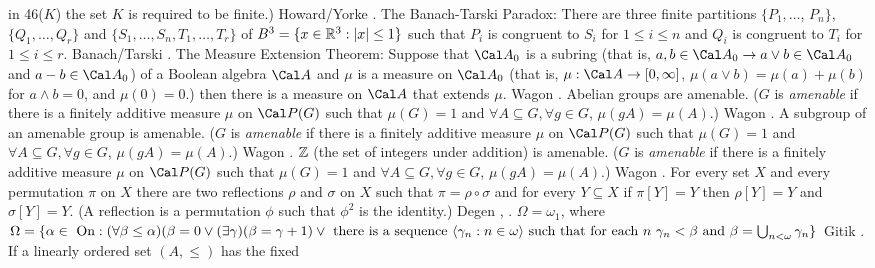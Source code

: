 in 46($K$) the set $K$ is required to be finite.) \ac{Howard/Yorke}
\cite{1987}.
\medskip
{} The Banach-Tarski Paradox: There are three finite
partitions $\{P_1,\ldots$, $P_n\}$, $\{Q_1,\ldots,Q_r\}$ and
$\{S_1,\ldots,S_n, T_1,\ldots,T_r\}$ of $B^3 = \{x\in {\Bbb R}^3 : |x|
\le 1\}$ such that $P_i$ is congruent to $S_i$ for $1\le i\le n$ and
$Q_i$ is congruent to $T_i$ for $1\le i\le r$.  \ac{Banach/Tarski}
\cite{1924}.
\medskip
{} The Measure Extension Theorem: Suppose that $\Cal
A_0$ is a subring (that is, $a,b \in \Cal A_0  \to a\vee b \in \Cal A_0$
and $a-b \in \Cal A_0$) of a Boolean algebra $\Cal A$ and $\mu$ is a
measure on $\Cal A_0$ (that is, $\mu:\Cal A \to [0,\infty]$, $\mu(a\vee b)
=\mu(a)+\mu(b)$ for $a\land b = 0$, and $\mu(0) = 0$.) then there is a
measure on $\Cal A$ that extends $\mu$.  \ac{Wagon} \cite{1985}.
\medskip
{} Abelian groups are amenable. ($G$ is {\it
amenable} if there is a finitely additive measure $\mu$ on $\Cal P(G)$
such that $\mu(G)=1$ and $\forall A\subseteq G, \forall g\in G$,
$\mu(gA)=\mu(A)$.) \ac{Wagon} \cite{1985}.
\medskip
{} A subgroup of an amenable group is amenable.
($G$ is {\it amenable} if there is a finitely additive measure $\mu$ on
$\Cal P(G)$ such that $\mu(G) = 1$ and $\forall A\subseteq G, \forall g
\in G$, $\mu(gA)=\mu(A)$.)  \ac{Wagon} \cite{1985}.
\medskip
{} $\Bbb Z$ (the set of integers under addition) is
amenable.  ($G$ is {\it amenable} if there is a finitely additive
measure $\mu$ on $\Cal P(G)$ such that $\mu(G) = 1$ and $\forall
A\subseteq G, \forall g\in G$, $\mu(gA)=\mu(A)$.)  \ac{Wagon} \cite{1985}.
\medskip
{} For every set $X$ and every permutation $\pi$
on $X$ there are two reflections $\rho$ and $\sigma$ on $X$ such that
$\pi =\rho\circ\sigma$ and for every $Y\subseteq X$ if $\pi[Y]=Y$
then $\rho[Y]=Y$ and $\sigma[Y]=Y$.  (A reflection is a permutation
$\phi$ such that $\phi^2$ is the identity.) \ac{Degen} \cite{1988},
\cite{2000}.
\medskip
{} $\Omega = \omega_1$, where  $\Omega =
\{\alpha\in\hbox{ On}: (\forall\beta\le\alpha)(\beta=0\vee
(\exists\gamma)(\beta=\gamma+1)\vee\hbox{ there is a sequence }
\langle\gamma_n: n\in\omega\rangle\hbox{ such that for each }n\
\gamma_n<\beta\hbox{ and } \beta=\bigcup_{n<\omega}\gamma_n\}$
\ac{Gitik} \cite{1980}.
\medskip
{} If a linearly ordered set $(A,\le)$ has the fixed
